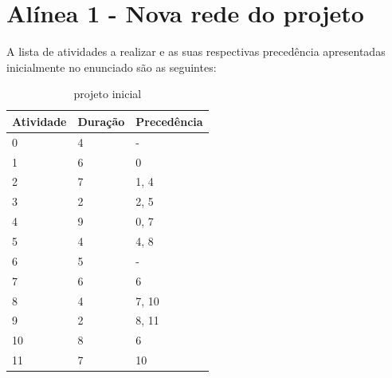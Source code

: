 \documentclass[a4paper]{report}
\begin{document}
\section{Alínea 1 - Nova rede do projeto}
A lista de atividades a realizar e as suas respectivas precedência apresentadas
inicialmente no enunciado são as seguintes:
\begin{table}[H]
    \centering
    \begin{tabular}{|l|l|l|}
        \hline
        Atividade & Duração & Precedência \\ \hline
        0         & 4       & -           \\ \hline
        1         & 6       & 0           \\ \hline
        2         & 7       & 1, 4        \\ \hline
        3         & 2       & 2, 5        \\ \hline
        4         & 9       & 0, 7        \\ \hline
        5         & 4       & 4, 8        \\ \hline
        6         & 5       & -           \\ \hline
        7         & 6       & 6           \\ \hline
        8         & 4       & 7, 10       \\ \hline
        9         & 2       & 8, 11       \\ \hline
        10        & 8       & 6           \\ \hline
        11        & 7       & 10          \\ \hline
    \end{tabular}
    \caption{projeto inicial}
\end{table}
\end{document}
